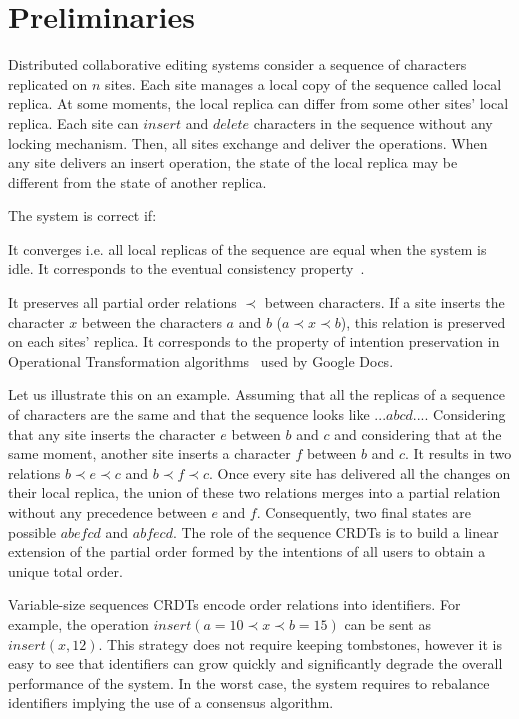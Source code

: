 \section{Preliminaries}
\label{sec:background}

Distributed collaborative editing systems consider a sequence of characters
replicated on $n$ sites. Each site manages a local copy of the sequence called
local replica. At some moments, the local replica can differ from some other
sites' local replica. Each site can $insert$ and $delete$ characters in the
sequence without any locking mechanism. Then, all sites exchange and deliver
the operations. When any site delivers an insert operation, the state of the
local replica may be different from the state of another replica.

The system is correct if:
\begin{inparaenum}[(i)]
\item It converges i.e. all local replicas of the sequence are equal when the
  system is idle. It corresponds to the eventual consistency
  property~\cite{johnson1975maintenance}.
\item It preserves all partial order relations $\prec$ between characters. If a
  site inserts the character $x$ between the characters $a$ and $b$ ($a \prec x
  \prec b$), this relation is preserved on each sites' replica. It
  corresponds to the property of intention preservation in Operational
  Transformation algorithms~\cite{sun1998achieving} used by Google Docs.
\end{inparaenum}

Let us illustrate this on an example. Assuming that all the replicas of a
sequence of characters are the same and that the sequence looks like
$...abcd...$. Considering that any site inserts the character $e$ between $b$
and $c$ and considering that at the same moment, another site inserts a
character $f$ between $b$ and $c$. It results in two relations $b \prec e \prec
c$ and $b \prec f \prec c$. Once every site has delivered all the changes on
their local replica, the union of these two relations merges into a partial
relation without any precedence between $e$ and $f$. Consequently, two final
states are possible $abefcd$ and $abfecd$. The role of the sequence CRDTs is to
build a linear extension of the partial order formed by the intentions of all
users to obtain a unique total order.

Variable-size sequences CRDTs encode order relations into identifiers. For
example, the operation $insert(a=10 \prec x \prec b=15)$ can be sent as
$insert(x,12)$. This strategy does not require keeping tombstones, however it
is easy to see that identifiers can grow quickly and significantly degrade the
overall performance of the system. In the worst case, the system requires to
rebalance identifiers implying the use of a consensus algorithm.

